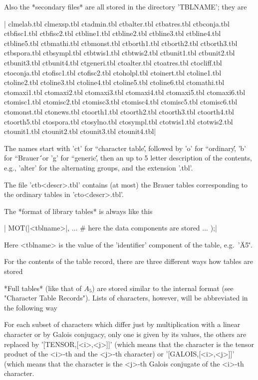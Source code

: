 Also the  *secondary  files* are  all stored in  the directory 'TBLNAME';
they are

|    clmelab.tbl   clmexsp.tbl   ctadmin.tbl   ctbalter.tbl  ctbatres.tbl
    ctbconja.tbl  ctbfisc1.tbl  ctbfisc2.tbl  ctbline1.tbl  ctbline2.tbl
    ctbline3.tbl  ctbline4.tbl  ctbline5.tbl  ctbmathi.tbl  ctbmonst.tbl
    ctborth1.tbl  ctborth2.tbl  ctborth3.tbl  ctbspora.tbl  ctbsympl.tbl
    ctbtwis1.tbl  ctbtwis2.tbl  ctbunit1.tbl  ctbunit2.tbl  ctbunit3.tbl
    ctbunit4.tbl  ctgeneri.tbl  ctoalter.tbl  ctoatres.tbl  ctocliff.tbl
    ctoconja.tbl  ctofisc1.tbl  ctofisc2.tbl  ctoholpl.tbl  ctoinert.tbl
    ctoline1.tbl  ctoline2.tbl  ctoline3.tbl  ctoline4.tbl  ctoline5.tbl
    ctoline6.tbl  ctomathi.tbl  ctomaxi1.tbl  ctomaxi2.tbl  ctomaxi3.tbl
    ctomaxi4.tbl  ctomaxi5.tbl  ctomaxi6.tbl  ctomisc1.tbl  ctomisc2.tbl
    ctomisc3.tbl  ctomisc4.tbl  ctomisc5.tbl  ctomisc6.tbl  ctomonst.tbl
    ctonews.tbl   ctoorth1.tbl  ctoorth2.tbl  ctoorth3.tbl  ctoorth4.tbl
    ctoorth5.tbl  ctospora.tbl  ctosylno.tbl  ctosympl.tbl  ctotwis1.tbl
    ctotwis2.tbl  ctounit1.tbl  ctounit2.tbl  ctounit3.tbl  ctounit4.tbl|

The names start with 'ct' for  ``character table\'\', followed by 'o' for
``ordinary\'\', 'b'  for ``Brauer\'\'\ or  'g' for ``generic\'\', then an
up  to  5  letter description of    the contents, e.g.,   'alter' for the
alternating groups, and the extension '.tbl'.

The file  'ctb<descr>.tbl'   contains    (at most)  the   Brauer   tables
corresponding to the ordinary tables in 'cto<descr>.tbl'.

The *format of library tables* is always like this\:

|    MOT(|<tblname>|,
          ...
               # here the data components are stored
          ... );|

Here <tblname> is the value of the 'identifier' component of the table,
e.g.\ '\"A5\"'.

For the contents of the table record, there are  three different ways how
tables are stored\:

*Full  tables* (like that  of $A_5$)  are stored similar  to the internal
format (see "Character  Table Records").   Lists of characters,  however,
will be abbreviated in the following way\:

For each subset of characters which differ  just by multiplication with a
linear character or by Galois conjugacy, only one is given by its values,
the  others are replaced by   '[TENSOR,[<i>,<j>]]' (which means that  the
character is the tensor  product of the <i>-th  and the <j>-th character)
or   '[GALOIS,[<i>,<j>]]' (which means that  the  character is the <j>-th
Galois conjugate of the <i>-th character.

